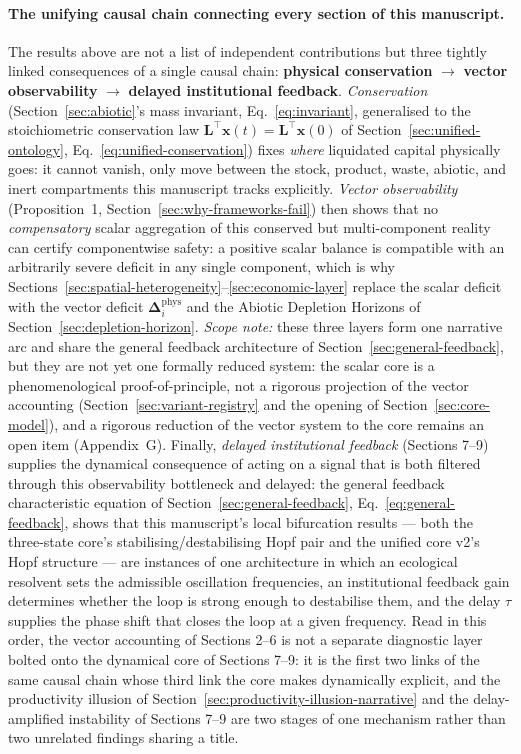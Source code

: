 \documentclass[twocolumn,10pt]{article}
\begin{document}
\paragraph{The unifying causal chain connecting every section of this manuscript.} The results above are not a list of independent contributions but three tightly linked consequences of a single causal chain: \textbf{physical conservation} $\to$ \textbf{vector observability} $\to$ \textbf{delayed institutional feedback}. \emph{Conservation} (Section~\ref{sec:abiotic}'s mass invariant, Eq.~\eqref{eq:invariant}, generalised to the stoichiometric conservation law $\mathbf L^\top\mathbf x(t)=\mathbf L^\top\mathbf x(0)$ of Section~\ref{sec:unified-ontology}, Eq.~\eqref{eq:unified-conservation}) fixes \emph{where} liquidated capital physically goes: it cannot vanish, only move between the stock, product, waste, abiotic, and inert compartments this manuscript tracks explicitly. \emph{Vector observability} (Proposition~1, Section~\ref{sec:why-frameworks-fail}) then shows that no \emph{compensatory} scalar aggregation of this conserved but multi-component reality can certify componentwise safety: a positive scalar balance is compatible with an arbitrarily severe deficit in any single component, which is why Sections~\ref{sec:spatial-heterogeneity}--\ref{sec:economic-layer} replace the scalar deficit with the vector deficit $\boldsymbol\Delta_i^{\text{phys}}$ and the Abiotic Depletion Horizons of Section~\ref{sec:depletion-horizon}. \emph{Scope note:} these three layers form one narrative arc and share the general feedback architecture of Section~\ref{sec:general-feedback}, but they are not yet one formally reduced system: the scalar core is a phenomenological proof-of-principle, not a rigorous projection of the vector accounting (Section~\ref{sec:variant-registry} and the opening of Section~\ref{sec:core-model}), and a rigorous reduction of the vector system to the core remains an open item (Appendix~G). Finally, \emph{delayed institutional feedback} (Sections 7--9) supplies the dynamical consequence of acting on a signal that is both filtered through this observability bottleneck and delayed: the general feedback characteristic equation of Section~\ref{sec:general-feedback}, Eq.~\eqref{eq:general-feedback}, shows that this manuscript's local bifurcation results --- both the three-state core's stabilising/destabilising Hopf pair and the unified core v2's Hopf structure --- are instances of one architecture in which an ecological resolvent sets the admissible oscillation frequencies, an institutional feedback gain determines whether the loop is strong enough to destabilise them, and the delay $\tau$ supplies the phase shift that closes the loop at a given frequency. Read in this order, the vector accounting of Sections 2--6 is not a separate diagnostic layer bolted onto the dynamical core of Sections 7--9: it is the first two links of the same causal chain whose third link the core makes dynamically explicit, and the productivity illusion of Section~\ref{sec:productivity-illusion-narrative} and the delay-amplified instability of Sections 7--9 are two stages of one mechanism rather than two unrelated findings sharing a title.
\end{document}
